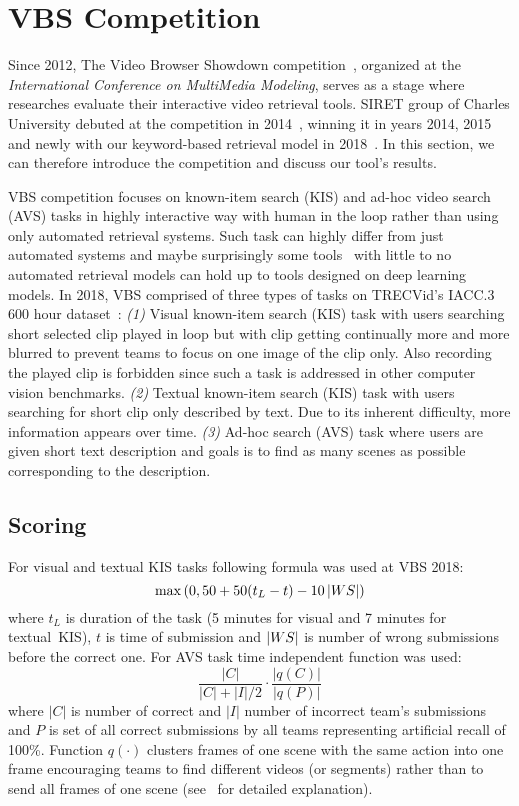 \section{VBS Competition}

Since 2012, The Video Browser Showdown competition~\cite{cobarzan2017interactive,Lokoc-influential-trends}, organized at the \textit{International Conference on MultiMedia Modeling}, serves as a stage where researches evaluate their interactive video retrieval tools. SIRET group of Charles University debuted at the competition in 2014~\cite{Lokoc-VBS2014}, winning it in years 2014, 2015 and newly with our keyword-based retrieval model in 2018~\cite{lokovc2018revisiting}. In this section, we can therefore introduce the competition and discuss our tool's results.

VBS competition focuses on known-item search (KIS) and ad-hoc video search (AVS) tasks in highly interactive
way with human in the loop rather than using only automated retrieval systems. Such task can highly differ from just automated systems and maybe surprisingly some tools~\cite{Storyboard-Based_Interface,duane2018virtual} with little to no automated retrieval models can hold up to tools designed on deep learning models. In 2018, VBS comprised of three types of tasks on TRECVid's IACC.3 600 hour dataset~\cite{awad2016trecvid}: \textit{(1)} Visual known-item search (KIS) task with users searching short selected clip played in loop but with clip getting continually more and more blurred to prevent teams to focus on one image of the clip only. Also recording the played clip is forbidden since such a task is addressed in other computer vision benchmarks. \textit{(2)} Textual known-item search (KIS) task with users searching for short clip only described by text. Due to its inherent difficulty, more information appears over time. \textit{(3)} Ad-hoc search (AVS) task where users are given short text description and goals is to find as many scenes as possible corresponding to the description.

\subsection{Scoring}
For visual and textual KIS tasks following formula was used at VBS 2018:
\begin{equation}
\max\left(0, 50 + 50 (t_L-t) - 10\left|{WS}\right|\right)
\end{equation}
where $t_L$ is duration of the task (5 minutes for visual and 7 minutes for textual~KIS), $t$ is time of submission and $\left|{WS}\right|$ is number of wrong submissions before the correct one. For AVS task time independent function was used:
\begin{equation}
\frac{|C|}{|C|+|I|/2}\cdot\frac{|q(C)|}{|q(P)|}
\end{equation}
where $|C|$ is number of correct and $|I|$ number of incorrect team's submissions and $P$ is set of all correct submissions by all teams representing artificial recall of 100\%. Function $q(\cdot)$ clusters frames of one scene with the same action into one frame encouraging teams to find different videos (or segments) rather than to send all frames of one scene (see~\cite{Lokoc-influential-trends} for detailed explanation).

